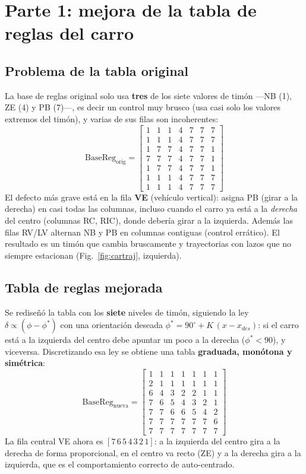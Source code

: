 \documentclass[11pt,a4paper]{article}
\begin{document}
\section{Parte 1: mejora de la tabla de reglas del carro}
\label{sec:car}

\subsection{Problema de la tabla original}
La base de reglas original solo usa \textbf{tres} de los siete valores de timón
—NB (1), ZE (4) y PB (7)—, es decir un control muy brusco (usa casi solo los valores
extremos del timón), y varias de sus
filas son incoherentes:
\[
\text{BaseReg}_{\text{orig}}=
\begin{bmatrix}
1&1&1&4&7&7&7\\
1&1&1&4&7&7&7\\
1&7&7&4&7&7&1\\
7&7&7&4&7&7&1\\
1&7&7&4&7&7&1\\
1&1&1&4&7&7&7\\
1&1&1&4&7&7&7
\end{bmatrix}
\]
El defecto más grave está en la fila \textbf{VE} (vehículo vertical): asigna PB
(girar a la derecha) en casi todas las columnas, incluso cuando el carro ya está a la
\emph{derecha} del centro (columnas RC, RIC), donde debería girar a la izquierda. Además
las filas RV/LV alternan NB y PB en columnas contiguas (control errático). El resultado
es un timón que cambia bruscamente y trayectorias con lazos que no siempre estacionan
(Fig.~\ref{fig:cartraj}, izquierda).

\subsection{Tabla de reglas mejorada}
Se rediseñó la tabla con los \textbf{siete} niveles de timón, siguiendo la ley
$\delta \propto (\phi-\phi^*)$ con una orientación deseada
$\phi^*=90^\circ + K\,(x-x_{des})$: si el carro está a la izquierda del centro debe
apuntar un poco a la derecha ($\phi^*<90$), y viceversa. Discretizando esa ley se obtiene
una tabla \textbf{graduada, monótona y simétrica}:
\[
\text{BaseReg}_{\text{nueva}}=
\begin{bmatrix}
1&1&1&1&1&1&1\\
2&1&1&1&1&1&1\\
6&4&3&2&2&1&1\\
7&6&5&4&3&2&1\\
7&7&6&6&5&4&2\\
7&7&7&7&7&7&6\\
7&7&7&7&7&7&7
\end{bmatrix}
\]
La fila central VE ahora es $[7\,6\,5\,4\,3\,2\,1]$: a la izquierda del centro gira a la
derecha de forma proporcional, en el centro va recto (ZE) y a la derecha gira a la
izquierda, que es el comportamiento correcto de auto-centrado.
\end{document}
